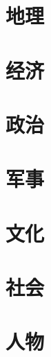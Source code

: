 \documentclass{annalsbook}
\begin{document}
    \tableofcontents
    \part{地理}
    
    
    
    \part{经济}
    \part{政治}
    \part{军事}
    \part{文化}
    \part{社会}
    \part{人物}
    \appendix
\end{document}
